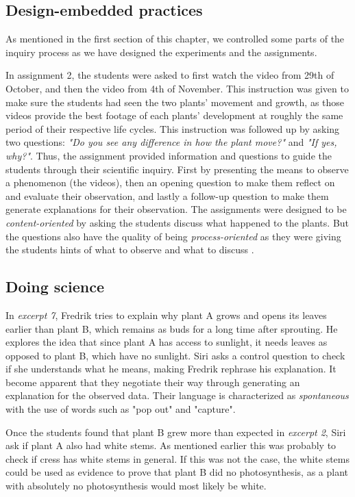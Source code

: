 \subsection{Design-embedded practices}
As mentioned in the first section of this chapter, we controlled some parts of the inquiry process as we have designed the experiments and the assignments. 

In assignment 2, the students were asked to first watch the video from 29th of October, and then the video from 4th of November. This instruction was given to make sure the students had seen the two plants' movement and growth, as those videos provide the best footage of each plants' development at roughly the same period of their respective life cycles. This instruction was followed up by asking two questions: \emph{"Do you see any difference in how the plant move?"} and \emph{"If yes, why?"}. Thus, the assignment provided information and questions to guide the students through their scientific inquiry. First by presenting the means to observe a phenomenon (the videos), then an opening question to make them reflect on and evaluate their observation, and lastly a follow-up question to make them generate explanations for their observation. The assignments were designed to be \emph{content-oriented} by asking the students discuss what happened to the plants. But the questions also have the quality of being \emph{process-oriented} as they were giving the students hints of what to observe and what to discuss \citep{furberg2009socio}.

\subsection{Doing science}
In \emph{excerpt 7}, Fredrik tries to explain why plant A grows and opens its leaves earlier than plant B, which remains as buds for a long time after sprouting. He explores the idea that since plant A has access to sunlight, it needs leaves as opposed to plant B, which have no sunlight. Siri asks a control question to check if she understands what he means, making Fredrik rephrase his explanation. It become apparent that they negotiate their way through generating an explanation for the observed data. Their language is characterized as \emph{spontaneous} with the use of words such as "pop out" and "capture". 

Once the students found that plant B grew more than expected in \emph{excerpt 2}, Siri ask if plant A also had white stems. As mentioned earlier this was probably to check if cress has white stems in general. If this was not the case, the white stems could be used as evidence to prove that plant B did no photosynthesis, as a plant with absolutely no photosynthesis would most likely be white. 

